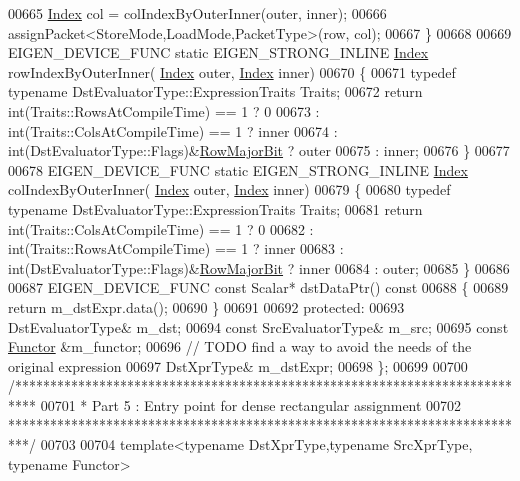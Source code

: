 \begin{DoxyCode}
00665     \hyperlink{namespace_eigen_a62e77e0933482dafde8fe197d9a2cfde}{Index} col = colIndexByOuterInner(outer, inner);
00666     assignPacket<StoreMode,LoadMode,PacketType>(row, col);
00667   \}
00668   
00669   EIGEN\_DEVICE\_FUNC \textcolor{keyword}{static} EIGEN\_STRONG\_INLINE \hyperlink{namespace_eigen_a62e77e0933482dafde8fe197d9a2cfde}{Index} rowIndexByOuterInner(
      \hyperlink{namespace_eigen_a62e77e0933482dafde8fe197d9a2cfde}{Index} outer, \hyperlink{namespace_eigen_a62e77e0933482dafde8fe197d9a2cfde}{Index} inner)
00670   \{
00671     \textcolor{keyword}{typedef} \textcolor{keyword}{typename} DstEvaluatorType::ExpressionTraits Traits;
00672     \textcolor{keywordflow}{return} int(Traits::RowsAtCompileTime) == 1 ? 0
00673       : int(Traits::ColsAtCompileTime) == 1 ? inner
00674       : int(DstEvaluatorType::Flags)&\hyperlink{group__flags_gae4f56c2a60bbe4bd2e44c5b19cbe8762}{RowMajorBit} ? outer
00675       : inner;
00676   \}
00677 
00678   EIGEN\_DEVICE\_FUNC \textcolor{keyword}{static} EIGEN\_STRONG\_INLINE \hyperlink{namespace_eigen_a62e77e0933482dafde8fe197d9a2cfde}{Index} colIndexByOuterInner(
      \hyperlink{namespace_eigen_a62e77e0933482dafde8fe197d9a2cfde}{Index} outer, \hyperlink{namespace_eigen_a62e77e0933482dafde8fe197d9a2cfde}{Index} inner)
00679   \{
00680     \textcolor{keyword}{typedef} \textcolor{keyword}{typename} DstEvaluatorType::ExpressionTraits Traits;
00681     \textcolor{keywordflow}{return} int(Traits::ColsAtCompileTime) == 1 ? 0
00682       : int(Traits::RowsAtCompileTime) == 1 ? inner
00683       : int(DstEvaluatorType::Flags)&\hyperlink{group__flags_gae4f56c2a60bbe4bd2e44c5b19cbe8762}{RowMajorBit} ? inner
00684       : outer;
00685   \}
00686 
00687   EIGEN\_DEVICE\_FUNC \textcolor{keyword}{const} Scalar* dstDataPtr()\textcolor{keyword}{ const}
00688 \textcolor{keyword}{  }\{
00689     \textcolor{keywordflow}{return} m\_dstExpr.data();
00690   \}
00691   
00692 \textcolor{keyword}{protected}:
00693   DstEvaluatorType& m\_dst;
00694   \textcolor{keyword}{const} SrcEvaluatorType& m\_src;
00695   \textcolor{keyword}{const} \hyperlink{struct_functor}{Functor} &m\_functor;
00696   \textcolor{comment}{// TODO find a way to avoid the needs of the original expression}
00697   DstXprType& m\_dstExpr;
00698 \};
00699 
00700 \textcolor{comment}{/***************************************************************************}
00701 \textcolor{comment}{* Part 5 : Entry point for dense rectangular assignment}
00702 \textcolor{comment}{***************************************************************************/}
00703 
00704 \textcolor{keyword}{template}<\textcolor{keyword}{typename} DstXprType,\textcolor{keyword}{typename} SrcXprType, \textcolor{keyword}{typename} Functor>

\end{DoxyCode}
